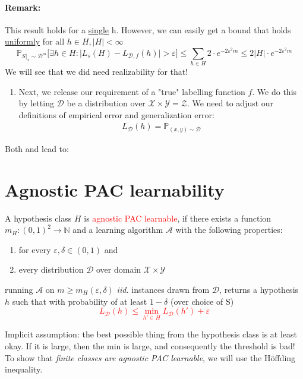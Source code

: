 \documentclass[10pt,a4paper]{article}
\theoremstyle{definition}
\theoremstyle{plain}
\begin{document}
\paragraph{Remark:} This result holds for a \underline{single} h. However, we can easily get a bound that holds \underline{uniformly} for all $h \in H, |H| < \infty$
$$ \mathbb{P}_{S|_x \sim \mathcal{D}^m} \bigg[\exists h \in H: \big|L_{s}(H) - L_{\mathcal{D}, f}(h) \big| > \varepsilon \bigg] \leq \sum_{h \in H} 2\cdot e^{-2 \varepsilon^2 m} \leq 2 \big|H\big| \cdot e^{-2 \varepsilon^2 m} $$ 
We will see that we did need realizability for that!

\begin{enumerate}
	\item[\protect\fbox{2}] Next, we release our requirement of a "true" labelling function $f$. We do this by letting $\mathcal{D}$ be a distribution over $\mathcal{X} \times \mathcal{Y} = \mathcal{Z}$. We need to adjust our definitions of empirical error and generalization error:
	\begin{eqnarray}
		L_{\mathcal{D}}(h) = \mathbb{P}_{(x, y) \sim \mathcal{D}}
	\end{eqnarray}
\end{enumerate}
Both \protect{} and \protect{} lead to:
\section*{Agnostic PAC learnability}
\begin{boxeddef}
	A hypothesis class $H$ is \textcolor{red}{agnostic PAC learnable}, if there exists a function $m_H: (0,1)^2 \to \mathbb{N}$ and a learning algorithm $\mathcal{A}$ with the following properties:
	\begin{enumerate}
		\item for every $\varepsilon, \delta \in (0,1)$ and
		\item every distribution $\mathcal{D}$ over domain $\mathcal{X} \times \mathcal{Y}$
	\end{enumerate}
	running $\mathcal{A}$ on $m \geq m_H(\varepsilon, \delta)$ \textit{iid.} instances drawn from $\mathcal{D}$, returns a hypothesis $h$ such that with probability of at least $1-\delta$ (over choice of S) 
	\textcolor{red}{$$ 
		L_{\mathcal{D}}(h) \leq \min_{h' \in H} L_{\mathcal{D}}(h') + \varepsilon
		$$}
\end{boxeddef}
Implicit assumption: the best possible thing from the hypothesis class is at least okay. If it is large, then the min is large, and consequently the threshold is bad!\\
To show that \textit{finite classes are agnostic PAC learnable}, we will use the Höffding inequality.
\end{document}

